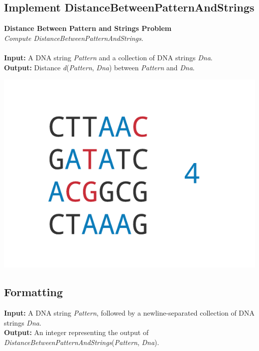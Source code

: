 \documentclass{article}
\begin{document}
\subsection{Implement DistanceBetweenPatternAndStrings}
\hline\vspace{5}
\noindent\textbf{Distance Between Pattern and Strings Problem}\\
\emph{Compute DistanceBetweenPatternAndStrings}.\\ \\
\noindent\textbf{Input:} A DNA string \emph{Pattern} and a collection of DNA strings \emph{Dna}.\\
\noindent\textbf{Output:} Distance \emph{d}(\emph{Pattern}, \emph{Dna}) between \emph{Pattern} and \emph{Dna}.
\begin{center}
    \includegraphics[scale=0.36]{c2/logos/2H.png} 
\end{center}
\hline\vspace{5}

\subsection*{Formatting}
\noindent\textbf{Input:} A DNA string \emph{Pattern}, followed by a newline-separated collection of DNA strings \emph{Dna}.\\
\noindent\textbf{Output:} An integer representing the output of \emph{DistanceBetweenPatternAndStrings}(\emph{Pattern}, \emph{Dna}).
\end{document}
